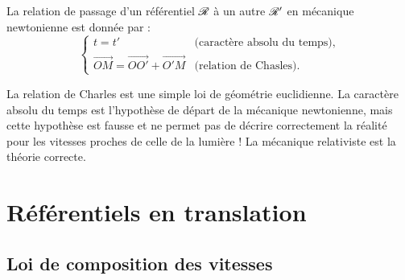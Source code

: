 \documentclass[12pt,fancy]{cours}
\begin{document}
\begin{theorem}\label{form:galile}
La relation de passage d'un référentiel $\mathcal{R}$ à un autre $\mathcal{R}'$ en mécanique newtonienne est donnée par :
$$
\begin{cases}
   t = t' & \text{(caractère absolu du temps),} \\
  \Vec{OM}  = \Vec{OO'} + \Vec{O'M} & \text{(relation de Chasles).}
\end{cases}
$$

\end{theorem}
\begin{remarque}
  La relation de Charles est une simple loi de géométrie euclidienne. La caractère absolu du temps est l'hypothèse de départ de la mécanique newtonienne, mais cette hypothèse est fausse et ne permet pas de décrire correctement la réalité pour les vitesses proches de celle de la lumière ! La mécanique relativiste est la théorie correcte.
\end{remarque}


\section{Référentiels en translation}


\subsection{Loi de composition des vitesses}
\end{document}
